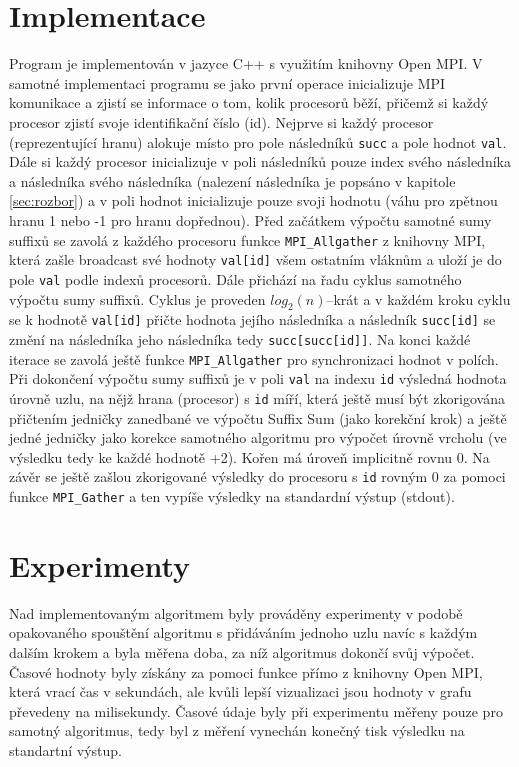 \documentclass[12pt, a4paper]{article}
\begin{document}
\section{Implementace}
Program je implementován v jazyce C++ s využitím knihovny Open MPI. V samotné implementaci programu se jako první operace inicializuje MPI komunikace a zjistí se informace o tom, kolik procesorů běží, přičemž si každý procesor zjistí svoje identifikační číslo (id). Nejprve si každý procesor (reprezentující hranu) alokuje místo pro pole následníků \texttt{succ} a pole hodnot \texttt{val}. Dále si každý procesor inicializuje v poli následníků pouze index svého následníka a následníka svého následníka (nalezení následníka je popsáno v kapitole\,\ref{sec:rozbor}) a v poli hodnot inicializuje pouze svoji hodnotu (váhu pro zpětnou hranu 1 nebo -1 pro hranu dopřednou). Před začátkem výpočtu samotné sumy suffixů se zavolá z každého procesoru funkce \texttt{MPI\_Allgather} z knihovny MPI, která zašle broadcast své hodnoty \texttt{val[id]} všem ostatním vláknům a uloží je do pole \texttt{val} podle indexů procesorů. Dále přichází na řadu cyklus samotného výpočtu sumy suffixů. Cyklus je proveden $log_{2}(n)$--krát a v každém kroku cyklu se k hodnotě \texttt{val[id]} přičte hodnota jejího následníka a následník \texttt{succ[id]} se změní na následníka jeho následníka tedy \texttt{succ[succ[id]]}. Na konci každé iterace se zavolá ještě funkce \texttt{MPI\_Allgather} pro synchronizaci hodnot v polích. Při dokončení výpočtu sumy suffixů je v poli \texttt{val} na indexu \texttt{id} výsledná hodnota úrovně uzlu, na nějž hrana (procesor) s \texttt{id} míří, která ještě musí být zkorigována přičtením jedničky zanedbané ve výpočtu Suffix Sum (jako korekční krok) a ještě jedné jedničky jako korekce samotného algoritmu pro výpočet úrovně vrcholu (ve výsledku tedy ke každé hodnotě +2). Kořen má úroveň implicitně rovnu 0. Na závěr se ještě zašlou zkorigované výsledky do procesoru s \texttt{id} rovným 0 za pomoci funkce \texttt{MPI\_Gather} a ten vypíše výsledky na standardní výstup (stdout).


\section{Experimenty}
Nad implementovaným algoritmem byly prováděny experimenty v podobě opakovaného spouštění algoritmu s přidáváním jednoho uzlu navíc s každým dalším krokem a byla měřena doba, za níž algoritmus dokončí svůj výpočet. Časové hodnoty byly získány za pomoci funkce přímo z knihovny Open MPI, která vrací čas v sekundách, ale kvůli lepší vizualizaci jsou hodnoty v grafu převedeny na milisekundy. Časové údaje byly při experimentu měřeny pouze pro samotný algoritmus, tedy byl z měření vynechán konečný tisk výsledku na standartní výstup.
\end{document}
